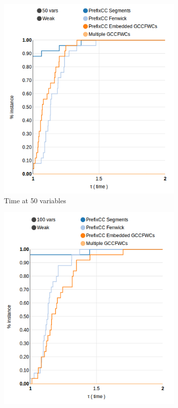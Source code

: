 \documentclass[a4paper,10pt]{article}
\begin{document}
\begin{figure}
    \centering
    \begin{subfigure}[b]{0.3\textwidth}
        \includegraphics[width=\textwidth]{img/weak-50vars-time}
        \caption{Time at 50 variables}
    \end{subfigure}
    \quad
    \begin{subfigure}[b]{0.3\textwidth}
        \includegraphics[width=\textwidth]{img/weak-100vars-time}

\end{subfigure}
\end{figure}
\end{document}
